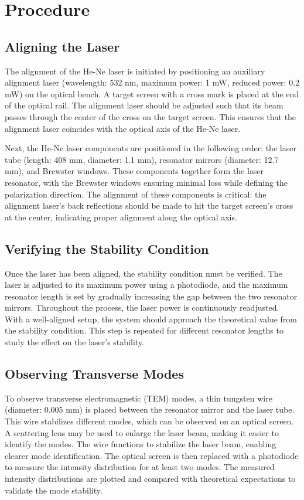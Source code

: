 \section{Procedure}

\subsection{Aligning the Laser}

The alignment of the He-Ne laser is initiated by positioning an auxiliary alignment laser (wavelength: 532 nm, maximum power: 1 mW, reduced power: 0.2 mW) on the optical bench. A target screen with a cross mark is placed at the end of the optical rail. The alignment laser should be adjusted such that its beam passes through the center of the cross on the target screen. This ensures that the alignment laser coincides with the optical axis of the He-Ne laser.

Next, the He-Ne laser components are positioned in the following order: the laser tube (length: 408 mm, diameter: 1.1 mm), resonator mirrors (diameter: 12.7 mm), and Brewster windows. These components together form the laser resonator, with the Brewster windows ensuring minimal loss while defining the polarization direction. The alignment of these components is critical: the alignment laser's back reflections should be made to hit the target screen's cross at the center, indicating proper alignment along the optical axis.

\subsection{Verifying the Stability Condition}

Once the laser has been aligned, the stability condition must be verified. The laser is adjusted to its maximum power using a photodiode, and the maximum resonator length is set by gradually increasing the gap between the two resonator mirrors. Throughout the process, the laser power is continuously readjusted. With a well-aligned setup, the system should approach the theoretical value from the stability condition. This step is repeated for different resonator lengths to study the effect on the laser's stability.

\subsection{Observing Transverse Modes}

To observe transverse electromagnetic (TEM) modes, a thin tungsten wire (diameter: 0.005 mm) is placed between the resonator mirror and the laser tube. This wire stabilizes different modes, which can be observed on an optical screen. A scattering lens may be used to enlarge the laser beam, making it easier to identify the modes. The wire functions to stabilize the laser beam, enabling clearer mode identification. The optical screen is then replaced with a photodiode to measure the intensity distribution for at least two modes. The measured intensity distributions are plotted and compared with theoretical expectations to validate the mode stability.

